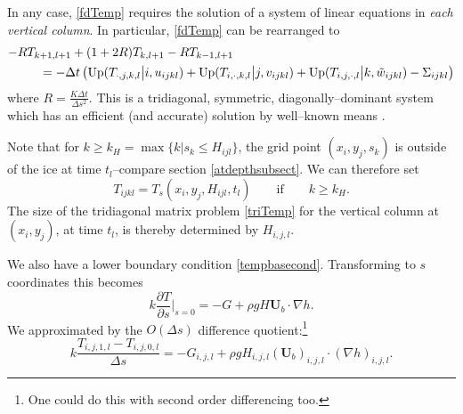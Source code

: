 \documentclass[12pt,final]{amsart}%
\theoremstyle{plain}
\theoremstyle{definition}
\theoremstyle{remark}
\newcommand{\dds}[1]{\ensuremath{\frac{\partial #1}{\partial s}}}
\newcommand{\grad}{\nabla}
\newcommand{\Up}{\ensuremath{\operatorname{Up}}}
\newcommand{\bU}{{\mathbf{U}}}
\begin{document}
In any case, \eqref{fdTemp} requires the solution of a system of linear equations in \emph{each vertical column}.  In particular, \eqref{fdTemp} can be rearranged to
\begin{align}\label{triTemp}
-R &T_{k+1,l+1} + (1+2R) T_{k,l+1} - R T_{k-1,l+1} \\
    &\quad = -\Delta t \left(\Up(T_{\cdot,j,k,l} \big|i,u_{ijkl}) + \Up(T_{i,\cdot,k,l} \big|j,v_{ijkl}) + \Up(T_{i,j,\cdot,l} \big|k,\tilde w_{ijkl}) - \Sigma_{ijkl}\right)\notag
\end{align}
where $R=\frac{K\Delta t}{\Delta s^2}$.  This is a tridiagonal, symmetric, diagonally--dominant system which has an efficient (and accurate) solution by well--known means \citep{Pressetal}.

Note that for $k \ge k_H = \max\{k\big|s_k\le H_{ijl}\}$, the grid point $(x_i,y_j,s_k)$ is outside of the ice at time $t_l$--compare section \ref{atdepthsubsect}.  We can therefore set
\begin{equation}\label{Taboveice}
T_{ijkl}=T_s(x_i,y_j,H_{ijl},t_l) \qquad \text{if} \qquad k\ge k_H.
\end{equation}
The size of the tridiagonal matrix problem \eqref{triTemp} for the vertical column at $(x_i,y_j)$, at time $t_l$, is thereby determined by $H_{i,j,l}$.

We also have a lower boundary condition \eqref{tempbasecond}.  Transforming to $s$ coordinates this becomes
\begin{equation}\label{stempbasecond}
k\dds{T}\Big|_{s=0} = -G + \rho g H \bU_b\cdot \grad h.
\end{equation}
We approximated by the $O(\Delta s)$ difference quotient:\footnote{One could do this with second order differencing too.}
\begin{equation}\label{stempbasefd}
k\frac{T_{i,j,1,l}-T_{i,j,0,l}}{\Delta s} = -G_{i,j,l} +\rho g H_{i,j,l} (\bU_b)_{i,j,l}\cdot(\grad h)_{i,j,l}.
\end{equation}
\end{document}
